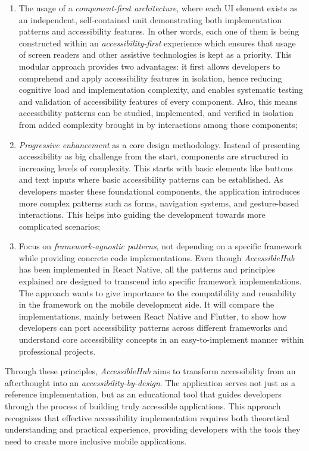 \begin{enumerate}
    \item The usage of a \textit{component-first architecture}, where each UI element exists as an independent, self-contained unit demonstrating both implementation patterns and accessibility features. In other words, each one of them is being constructed within an \textit{accessibility-first} experience which ensures that usage of screen readers and other assistive technologies is kept as a priority. This modular approach provides two advantages: it first allows developers to comprehend and apply accessibility features in isolation, hence reducing cognitive load and implementation complexity, and enables systematic testing and validation of accessibility features of every component. Also, this means accessibility patterns can be studied, implemented, and verified in isolation from added complexity brought in by interactions among those components;

    \item \textit{Progressive enhancement} as a core design methodology. Instead of presenting accessibility as big challenge from the start, components are structured in increasing levels of complexity. This starts with basic elements like buttons and text inputs where basic accessibility patterns can be established. As developers master these foundational components, the application introduces more complex patterns such as forms, navigation systems, and gesture-based interactions. This helps into guiding the development towards more complicated scenarios;

    \item Focus on \textit{framework-agnostic patterns}, not depending on a specific framework while providing concrete code implementations. Even though \textit{AccessibleHub} has been implemented in React Native, all the patterns and principles explained are designed to transcend into specific framework implementations. The approach wants to give importance to the compatibility and reusability in the framework on the mobile development side. It will compare the implementations, mainly between React Native and Flutter, to show how developers can port accessibility patterns across different frameworks and understand core accessibility concepts in an easy-to-implement manner within professional projects. 
    
\end{enumerate}

Through these principles, \textit{AccessibleHub} aims to transform accessibility from an afterthought into an \textit{accessibility-by-design}. The application serves not just as a reference implementation, but as an educational tool that guides developers through the process of building truly accessible applications. This approach recognizes that effective accessibility implementation requires both theoretical understanding and practical experience, providing developers with the tools they need to create more inclusive mobile applications.

